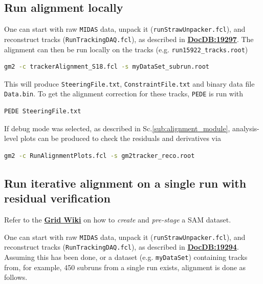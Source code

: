 \documentclass[12pt]{article}
\begin{document}
\subsection{Run alignment locally}
One can start with raw \texttt{MIDAS} data, unpack it (\verb!runStrawUnpacker.fcl!), and reconstruct tracks (\verb!RunTrackingDAQ.fcl!), as described in \textbf{\href{https://gm2-docdb.fnal.gov/cgi-bin/private/ShowDocument?docid=19297}{DocDB:19297}}. The alignment can then be run locally on the tracks (e.g. \verb!run15922_tracks.root!)
\begin{lstlisting}[language=bash] 
     gm2 -c trackerAlignment_S18.fcl -s myDataSet_subrun.root \end{lstlisting}
This will produce \verb!SteeringFile.txt!, \verb!ConstraintFile.txt! and binary data file \verb!Data.bin!. To get the alignment correction for these tracks, \verb!PEDE! is run with
\begin{lstlisting}[language=bash] 
     PEDE SteeringFile.txt \end{lstlisting}
If debug mode was selected, as described in Sc.\ref{sub:alignment_module}, analysis-level plots can be produced to check the residuals and derivatives via
\begin{lstlisting}[language=bash] 
    gm2 -c RunAlignmentPlots.fcl -s gm2tracker_reco.root\end{lstlisting}

\subsection{Run iterative alignment on a single run with residual verification}\label{sub:run_iterative}
Refer to the \textbf{\href{https://redmine.fnal.gov/redmine/projects/g-2/wiki/Job_Running_Submission_FAQ}{Grid Wiki}} on how to \textit{create} and \textit{pre-stage} a SAM dataset. 

One can start with raw \texttt{MIDAS} data, unpack it (\verb!runStrawUnpacker.fcl!), and reconstruct tracks (\verb!RunTrackingDAQ.fcl!), as described in \textbf{\href{https://gm2-docdb.fnal.gov/cgi-bin/private/ShowDocument?docid=19294}{DocDB:19294}}. Assuming this has been done, or a dataset (e.g. \texttt{myDataSet}) containing tracks from, for example, 450 subruns from a single run exists, alignment is done as follows.
\end{document}

